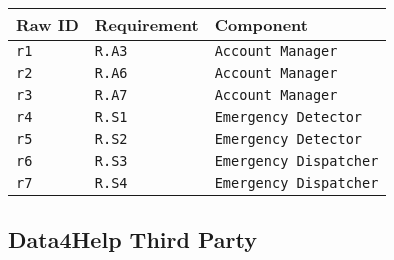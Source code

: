 \documentclass[../DD0.tex]{subfiles}
\begin{document}
    \begin{table}[h!]

      \centering
      \begin{tabularx}{.8\linewidth}{|X|X|X|}
        \hline
        \textbf{Raw ID} & \textbf{Requirement} & \textbf{Component} \\ \hline
        \texttt{r1} & \texttt{R.A3} & \texttt{Account Manager} \\
        \hline
        \texttt{r2} & \texttt{R.A6} & \texttt{Account Manager} \\
        \hline
        \texttt{r3} & \texttt{R.A7} & \texttt{Account Manager} \\
        \hline
        \texttt{r4} & \texttt{R.S1}  & \texttt{Emergency Detector} \\
        \hline
        \texttt{r5} & \texttt{R.S2}  & \texttt{Emergency Detector} \\
        \hline
        \texttt{r6} & \texttt{R.S3}  & \texttt{Emergency Dispatcher} \\
        \hline
        \texttt{r7} & \texttt{R.S4}  & \texttt{Emergency Dispatcher} \\
        \hline
      \end{tabularx}
      \label{tab:automateduser}

    \end{table}

\subsection{Data4Help Third Party}
\end{document}
